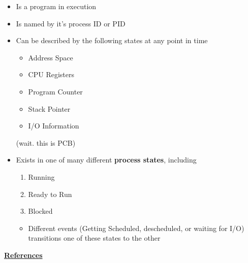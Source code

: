 \documentclass[12pt]{article}
\begin{document}
\begin{itemize}
    \item Is a program in execution
    \item Is named by it's process ID or PID
    \item Can be described by the following states at any point in time

    \begin{itemize}
        \item Address Space
        \item CPU Registers
        \item Program Counter
        \item Stack Pointer
        \item I/O Information
    \end{itemize}

    (wait. this is PCB)

    \item Exists in one of many different \textbf{process states}, including

    \begin{enumerate}[1.]
        \item Running
        \item Ready to Run
        \item Blocked
    \end{enumerate}

    \bigskip

    \begin{itemize}
        \item Different events (Getting Scheduled, descheduled, or waiting for I/O)
        transitions one of these states to the other
    \end{itemize}

\end{itemize}

\bigskip

\underline{\textbf{References}}
\end{document}
